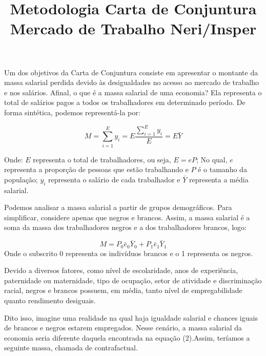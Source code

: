 \documentclass{article}
\title{Metodologia Carta de Conjuntura Mercado de Trabalho Neri/Insper}
\begin{document}
	\maketitle
	
	Um dos objetivos da Carta de Conjuntura consiste em apresentar o montante da massa salarial perdida devido às desigualdades no acesso ao mercado de trabalho e nos salários. Afinal, o que é a massa salarial de uma economia? Ela representa o total de salários pagos a todos os trabalhadores em determinado período. De forma sintética, podemos representá-la por:
 \newline
	
	\begin{equation}
		M = \sum_{i =1}^{E} y_{i} = E \frac{\sum_{i =1}^{E} y_{i}}{E} = E \bar{Y}
	\end{equation}
	
	Onde: $E$ representa o total de trabalhadores, ou seja, $E = eP$; \newline
	No qual, $e$ representa a proporção de pessoas que estão trabalhando e $P$ é o tamanho da população; \newline
	$y_{i}$ representa o salário de cada trabalhador e $\bar{Y}$ representa a média salarial. \newline
	
	Podemos analisar a massa salarial a partir de grupos demográficos. Para simplificar, considere apenas que negros e brancos. Assim, a massa salarial é a soma da massa dos trabalhadores negros e a dos trabalhadores brancos, logo:
	
	\begin{equation}
		M =  P_{0}\bar{e}_{0} \bar{Y}_{0} + P_{1}\bar{e}_{1} \bar{Y}_{1} 
	\end{equation}
	Onde o subscrito 0 representa os indivíduos brancos e o 1 representa os negros. \newline
	
	Devido a diversos fatores, como nível de escolaridade, anos de experiência, paternidade ou maternidade, tipo de ocupação, setor de atividade e discriminação racial, negros e brancos possuem, em média, tanto nível de empregabilidade quanto rendimento desiguais. \newline
	
	Dito isso, imagine uma realidade na qual haja igualdade salarial e chances iguais de brancos e negros estarem empregados. Nesse cenário, a massa salarial da economia seria diferente daquela encontrada na equação (2).Assim, teríamos a seguinte massa, chamada de contrafactual.
\end{document}
